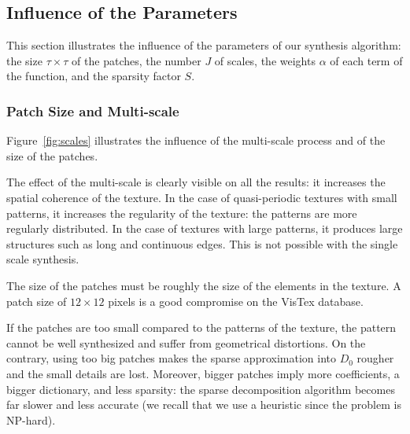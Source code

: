 \subsection{Influence of the Parameters}

This section illustrates the influence of the parameters of our synthesis algorithm:
the size $\tau\times\tau$ of the patches, the number $J$ of scales, the weights $\alpha$ of each term of the function, and the sparsity factor $S$.


\subsubsection{Patch Size and Multi-scale}

Figure~\ref{fig:scales} illustrates the influence of the multi-scale process and of the size of the patches.

The effect of the multi-scale is clearly visible on all the results: it increases the spatial coherence of the texture.
In the case of quasi-periodic textures with small patterns, it increases the regularity of the texture:
the patterns are more regularly distributed.
In the case of textures with large patterns, it produces large structures such as long and continuous edges.
This is not possible with the single scale synthesis.

The size of the patches must be roughly the size of the elements in the texture.
A patch size of $12\times12$ pixels is a good compromise on the VisTex database.

If the patches are too small compared to the patterns of the texture, the pattern cannot be well synthesized and suffer from geometrical distortions.
On the contrary, using too big patches makes the sparse approximation into $D_0$ rougher and the small details are lost.
Moreover, bigger patches imply more coefficients, a bigger dictionary, and less sparsity: the sparse decomposition algorithm becomes far slower and less accurate (we recall that we use a heuristic since the problem is NP-hard).

